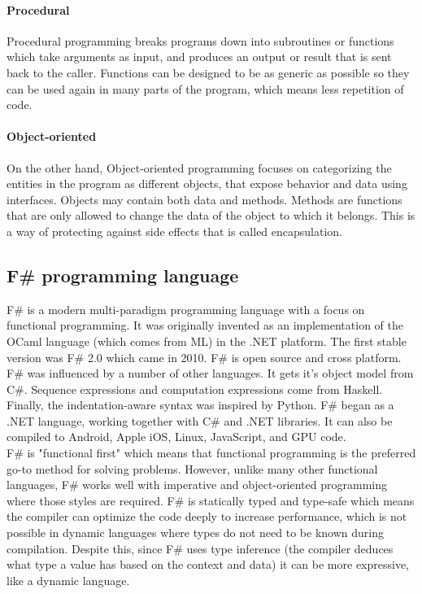 \documentclass[12pt, a4paper]{article}
\begin{document}
\newpage
\paragraph{Procedural} Procedural programming breaks programs down into subroutines or functions which take arguments as input, and produces an output or result that is sent back to the caller. Functions can be designed to be as generic as possible so they can be used again in many parts of the program, which means less repetition of code.

\paragraph{Object-oriented} On the other hand, Object-oriented programming focuses on categorizing the entities in the program as different objects, that expose behavior and data using interfaces. Objects may contain both data and methods. Methods are functions that are only allowed to change the data of the object to which it belongs. This is a way of protecting against side effects that is called encapsulation.


\newpage
\subsection{F\# programming language}
F\# is a modern multi-paradigm programming language with a focus on functional programming. It was originally invented as an implementation of the OCaml language (which comes from ML) in the .NET platform. The first stable version was F\# 2.0 which came in 2010. F\# is open source and cross platform. F\# was influenced by a number of other languages. It gets it’s object model from C\#. Sequence expressions and computation expressions come from Haskell. Finally, the indentation-aware syntax was inspired by Python. F\# began as a .NET language, working together with C\# and .NET libraries. It can also be compiled to Android, Apple iOS, Linux, JavaScript, and GPU code.\\

F\# is "functional first" which means that functional programming is the preferred go-to method for solving problems. However, unlike many other functional languages, F\# works well with imperative and object-oriented programming where those styles are required. F\# is statically typed and type-safe which means the compiler can optimize the code deeply to increase performance, which is not possible in dynamic languages where types do not need to be known during compilation. Despite this, since F\# uses type inference (the compiler deduces what type a value has based on the context and data) it can be more expressive, like a dynamic language.\\
\end{document}
